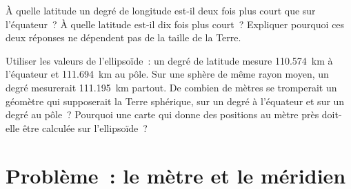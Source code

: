 \begin{exercise}[$\star\star\star$]\label{exo:g10:measuring-the-earth:14}
À quelle latitude un degré de longitude est-il deux fois plus court que sur
l'équateur~? À quelle latitude est-il dix fois plus court~? Expliquer
pourquoi ces deux réponses ne dépendent pas de la taille de la Terre.
\end{exercise}

\begin{exercise}[$\star\star\star$]\label{exo:g10:measuring-the-earth:15}
Utiliser les valeurs de l'ellipsoïde~: un degré de latitude mesure
\qty{110.574}{km} à l'équateur et \qty{111.694}{km} au pôle. Sur une sphère
de même rayon moyen, un degré mesurerait \qty{111.195}{km} partout. De
combien de mètres se tromperait un géomètre qui supposerait la Terre
sphérique, sur un degré à l'équateur et sur un degré au pôle~? Pourquoi une
carte qui donne des positions au mètre près doit-elle être calculée sur
l'ellipsoïde~?
\end{exercise}

\section{Problème~: le mètre et le méridien}


